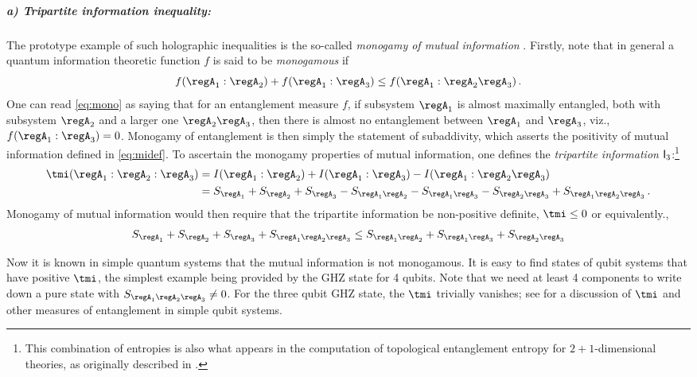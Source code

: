 \documentclass[12pt,openany]{book}
\begin{document}
\subparagraph{a) Tripartite information inequality:} The prototype example of such holographic inequalities is the so-called {\em monogamy of mutual information} \cite{Hayden:2011ag}. Firstly, note that in  general a quantum information theoretic function $f$ is said to be \emph{monogamous} if
%
\begin{equation}
f(\regA_1:\regA_2)+f(\regA_1:\regA_3)\leq f(\regA_1 : \regA_2 \regA_3) \,.
\label{eq:mono}
\end{equation}
%
One can read \eqref{eq:mono} as saying that for an entanglement measure $f$, if  subsystem $\regA_1$ is almost maximally entangled, both with subsystem $\regA_2$ and a larger one $\regA_2\regA_3$, then there is almost no entanglement between $\regA_1$ and $\regA_3$, viz., $f( \regA_1: \regA_3)=0$. Monogamy of entanglement is then simply the statement of subaddivity, which asserts the positivity of mutual information defined in \eqref{eq:midef}. To ascertain the monogamy properties of mutual information, one defines the \emph{tripartite information} ${\sf I}_3$:\footnote{ This combination of entropies is also what appears in the computation of topological entanglement entropy for $2+1$-dimensional theories, as originally described  in
\cite{Kitaev:2005dm}. }
%
\begin{equation}
\begin{split}
\tmi(\regA_1 : \regA_2 : \regA_3)&= I(\regA_1: \regA_2) +I(\regA_1: \regA_3) - I(\regA_1: \regA_2 \regA_3)
\\
& = S_{\regA_1} + S_{\regA_2} + S_{\regA_3} - S_{\regA_1 \regA_2} - S_{\regA_1 \regA_3}  -S_{\regA_2 \regA_3}  + S_{\regA_1 \regA_2 \regA_3} \,.
\end{split}
\label{eq:mmi}
\end{equation}
%
Monogamy of mutual information would then require that the tripartite information be non-positive definite,
$\tmi \leq 0$ or equivalently.,
%
\begin{align}
 S_{\regA_1} + S_{\regA_2} + S_{\regA_3} + S_{\regA_1 \regA_2 \regA_3}  \leq  S_{\regA_1 \regA_2} + S_{\regA_1 \regA_3}  +S_{\regA_2 \regA_3}
\label{eq:mmi2}
\end{align}
%

Now it is known in simple quantum systems that the mutual information is not monogamous. It is easy to find states of qubit systems that have positive $\tmi$, the simplest example being provided by the GHZ state for 4 qubits. Note that we need at least 4 components to write down a pure state with $S_{\regA_1 \regA_2 \regA_3} \neq 0$. For the three qubit GHZ state, the $\tmi$ trivially vanishes; see \cite{Rangamani:2015qwa}  for a discussion of $\tmi$ and other measures of entanglement in simple qubit systems.
\end{document}
